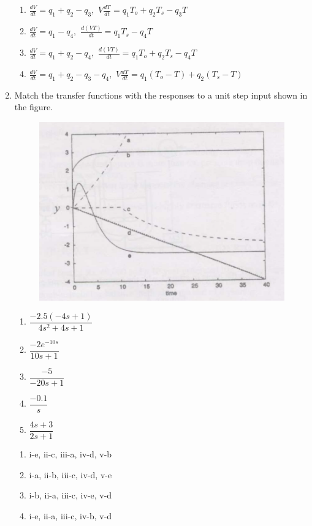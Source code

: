 \documentclass[journal,12pt,onecolumn]{IEEEtran}
\theoremstyle{remark}
\begin{document}
\begin{enumerate}
\begin{enumerate}
    \item $\frac{dV}{dt} = q_1 + q_2 - q_3,$ \hspace{1cm} $V\frac{dT}{dt} = q_1T_o + q_2T_s - q_3T$
    \item $\frac{dV}{dt} = q_1 - q_4,$ \hspace{1cm} $\frac{d(VT)}{dt} = q_1T_s - q_4T$
    \item $\frac{dV}{dt} = q_1 + q_2 - q_4,$ \hspace{1cm} $\frac{d(VT)}{dt} = q_1T_o + q_2T_s - q_4T$
    \item $\frac{dV}{dt} = q_1 + q_2 - q_3 - q_4,$ \hspace{1cm} $V\frac{dT}{dt} = q_1(T_o - T) + q_2(T_s - T)$
\end{enumerate}
\newpage
    \item Match the transfer functions with the responses to a unit step input shown in the figure.
\begin{figure}[H]
    \centering
    \includegraphics[width=0.5\columnwidth]{figs/61.png}
    \caption{}
    \label{fig:61}
\end{figure}
    \begin{enumerate}[label =\roman*]
    \item $ \dfrac{-2.5(-4s+1)}{4s^2 + 4s + 1} $
    \item $ \dfrac{-2e^{-10s}}{10s+1} $
    \item $ \dfrac{-5}{-20s+1} $
    \item $ \dfrac{-0.1}{s} $
    \item $ \dfrac{4s+3}{2s+1} $
\end{enumerate}

\begin{enumerate}
    \item i-e, ii-c, iii-a, iv-d, v-b
    \item i-a, ii-b, iii-c, iv-d, v-e
    \item i-b, ii-a, iii-c, iv-e, v-d
    \item i-e, ii-a, iii-c, iv-b, v-d
\end{enumerate}


\end{enumerate}
\end{document}
